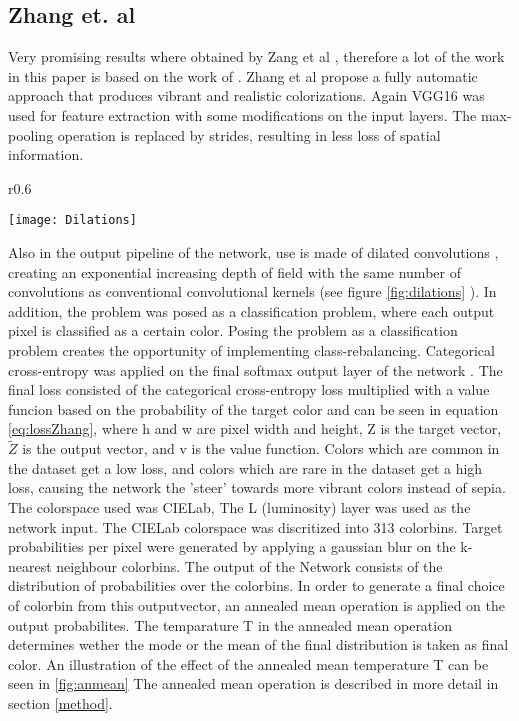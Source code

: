 \subsection{Zhang et. al}
Very promising results where obtained by Zang et al \cite{Zhang}, therefore a lot of the work in this paper is based on the work of \cite{Zhang}.
 Zhang et al propose a fully
automatic approach that produces vibrant and realistic colorizations. Again VGG16 was used for feature extraction with some modifications on the input layers. The max-pooling operation is replaced by strides, resulting in less loss of spatial information. 
\begin{wrapfigure}{r}{0.6\textwidth}
	\begin{center}
		\texttt{[image: Dilations]}
	\end{center}
	\caption{Illustration of dilated convolutions. Figure c shows a receptive field of 15 after only 3 convolutions. Normal convolutions would have a receptive field of 7 after 3 convolutions \cite{yu2015multi}.}
	\label{fig:dilations}
\end{wrapfigure}
Also in the output pipeline of the network, use is made of dilated convolutions \cite{yu2015multi}, creating an exponential increasing depth of field with the same number of convolutions as conventional convolutional kernels (see figure \ref{fig:dilations} ).
In addition, the problem was posed as a classification problem, where each output pixel is classified as a certain color. Posing the problem as a classification problem creates the opportunity of implementing class-rebalancing. Categorical cross-entropy was applied on the final softmax output layer of the network \cite{de2005tutorial}. The final loss consisted of the categorical cross-entropy loss multiplied with a value funcion based on the probability of the target color and can be seen in equation \ref{eq:lossZhang}, where h and w are pixel width and height, Z is the target vector, $\widetilde{Z}$ is the output vector, and v is the value function.
Colors which are common in the dataset get a low loss, and colors which are rare in the dataset get a high loss, causing the network the 'steer' towards more vibrant colors instead of sepia. The colorspace used was CIELab, The L (luminosity) layer was used as the network input. The CIELab colorspace was discritized into 313 colorbins. Target probabilities per pixel were generated by applying a gaussian blur on the k-nearest neighbour colorbins. The output of the Network consists of the distribution of probabilities over the colorbins. In order to generate a final choice of colorbin from this outputvector, an annealed mean operation is applied on the output probabilites. The temparature T in the annealed mean operation determines wether the mode or the mean of the final distribution is taken as final color. An illustration of the effect of the annealed mean temperature T can be seen in \ref{fig:anmean} The annealed mean operation is described in more detail in section \ref{method}.

